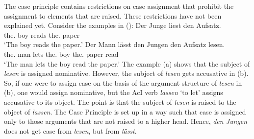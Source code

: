 The case principle contains restrictions on case assignment that prohibit the assignment to
elements that are raised. These restrictions have not been explained yet. Consider the examples in ():
\eal
\ex
\gll Der Junge liest den Aufsatz.\\
     the.\NOM{} boy reads the.\ACC{} paper\\\german
\glt `The boy reads the paper.'
\ex\label{ex-the-man-lets-the-boy-read-the-book}
\gll Der Mann lässt den Jungen den Aufsatz lesen.\\
     the.\NOM{} man lets the.\ACC{} boy the.\ACC{} paper read\\
\glt `The man lets the boy read the paper.'
\zl
The example (a) shows that the subject of \emph{lesen} is
assigned nominative. However, the subject of \emph{lesen} gets accusative in (b). So, if
one were to assign case on the basis of the argument structure of \emph{lesen} in (b), one
would assign nominative, but the AcI verb \emph{lassen} `to let' assigns accusative to its object. The
point is that the subject of \emph{lesen} is raised to the object of \emph{lassen}. The Case
Principle is set up in a way such that case is assigned only to those arguments that are not raised
to a higher head. Hence, \emph{den Jungen} does not get case from \emph{lesen}, but from \emph{lässt}.

